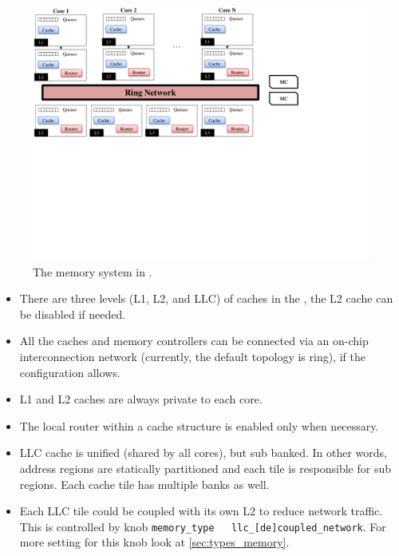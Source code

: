 \begin{figure}[htb]
\centering
\includegraphics[width=6.5in]{figs/memory}
\caption{The memory system in \SIM.}
\label{fig:memory}
\end{figure}


\begin{itemize} 
  \item There are three levels (L1, L2, and LLC) of caches in the
	\SIM , the L2 cache can be disabled if needed.

  \item All the caches and memory controllers can be connected via an
    on-chip interconnection network (currently, the default topology
    is ring), if the configuration allows.

  \item L1 and L2 caches are always private to each core.

  \item The local router within a cache structure is enabled only when
	necessary.

  \item LLC cache is unified (shared by all cores), but sub banked. In
    other words, address regions are statically partitioned and each
    tile is responsible for sub regions. Each cache tile has multiple
    banks as well.
   
  \item Each LLC tile could be coupled with its own L2 to reduce network
	  traffic. This is controlled by knob \Verb+memory_type   llc_[de]coupled_network+.
	  For more setting for this knob look at \ref{sec:types_memory}.

\end{itemize}



